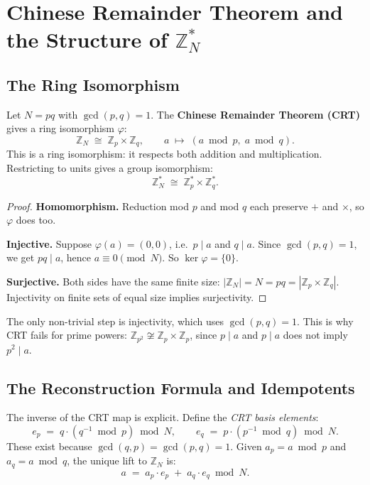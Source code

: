 \section{Chinese Remainder Theorem and the Structure of \texorpdfstring{$\mathbb{Z}_N^*$}{the unit group modulo N}}

\subsection{The Ring Isomorphism}

Let $N = pq$ with $\gcd(p,q) = 1$. The \textbf{Chinese Remainder Theorem (CRT)} gives a ring isomorphism $\varphi$:
\[
    \mathbb{Z}_N \;\cong\; \mathbb{Z}_p \times \mathbb{Z}_q,
    \qquad
    a \;\mapsto\; (a \bmod p,\; a \bmod q).
\]
This is a ring isomorphism: it respects both addition and multiplication. Restricting to units gives a group isomorphism:
\[
    \mathbb{Z}_N^* \;\cong\; \mathbb{Z}_p^* \times \mathbb{Z}_q^*.
\]

\begin{proof}
\textbf{Homomorphism.} Reduction mod $p$ and mod $q$ each preserve $+$ and $\times$, so $\varphi$ does too.
 
\textbf{Injective.} Suppose $\varphi(a) = (0, 0)$, i.e.\ $p \mid a$ and $q \mid a$.
Since $\gcd(p, q) = 1$, we get $pq \mid a$, hence $a \equiv 0 \pmod{N}$.
So $\ker \varphi = \{0\}$.
 
\textbf{Surjective.} Both sides have the same finite size:
$|\mathbb{Z}_N| = N = pq = |\mathbb{Z}_p \times \mathbb{Z}_q|$.
Injectivity on finite sets of equal size implies surjectivity.
\end{proof}
 
\begin{remark}
The only non-trivial step is injectivity, which uses $\gcd(p,q)=1$.
This is why CRT fails for prime powers: $\mathbb{Z}_{p^2} \not\cong \mathbb{Z}_p \times \mathbb{Z}_p$,
since $p \mid a$ and $p \mid a$ does not imply $p^2 \mid a$.
\end{remark}

\subsection{The Reconstruction Formula and Idempotents}

The inverse of the CRT map is explicit. Define the \emph{CRT basis elements}:
\[
    e_p \;=\; q \cdot (q^{-1} \bmod p) \bmod N,
    \qquad
    e_q \;=\; p \cdot (p^{-1} \bmod q) \bmod N.
\]
These exist because $\gcd(q,p) = \gcd(p,q) = 1$.
Given $a_p = a \bmod p$ and $a_q = a \bmod q$, the unique lift to $\mathbb{Z}_N$ is:
\[
    a \;=\; a_p \cdot e_p \;+\; a_q \cdot e_q \bmod N. \tag{CRT reconstruction}
\]

